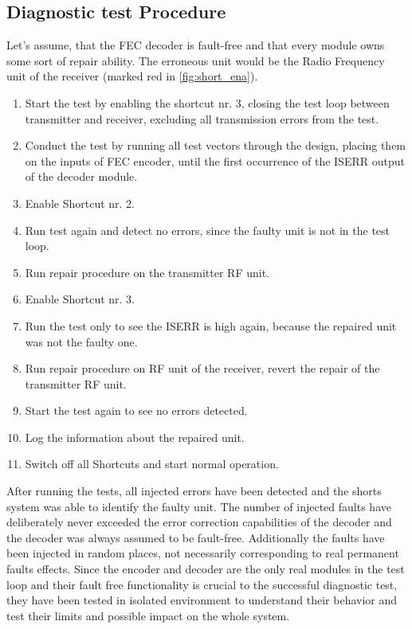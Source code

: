 \subsection{Diagnostic test Procedure}
Let's assume, that the FEC decoder is fault-free and that every module owns some sort of repair ability. The erroneous unit would be the Radio Frequency unit of the receiver (marked red in \autoref{fig:short_ena}).
\begin{enumerate}
    \item Start the test by enabling the shortcut nr. 3, closing the test loop between transmitter and receiver, excluding all transmission errors from the test.
    \item Conduct the test by running all test vectors through the design, placing them on the inputs of FEC encoder, until the first occurrence of the ISERR output of the decoder module.
    \item Enable Shortcut nr. 2.
    \item Run test again and detect no errors, since the faulty unit is not in the test loop.
    \item Run repair procedure on the transmitter RF unit.
    \item Enable Shortcut nr. 3.
    \item Run the test only to see the ISERR is high again, because the repaired unit was not the faulty one.
    \item Run repair procedure on RF unit of the receiver, revert the repair of the transmitter RF unit.
    \item Start the test again to see no errors detected.
    \item Log the information about the repaired unit.
    \item Switch off all Shortcuts and start normal operation.
\end{enumerate}

After running the tests, all injected errors have been detected and the shorts system was able to identify the faulty unit. The number of injected faults have deliberately never exceeded the error correction capabilities of the decoder and the decoder was always assumed to be fault-free. Additionally the faults have been injected in random places, not necessarily corresponding to real permanent faults effects. Since the encoder and decoder are the only real modules in the test loop and their fault free functionality is crucial to the successful diagnostic test, they have been tested in isolated environment to understand their behavior and test their limits and possible impact on the whole system.

